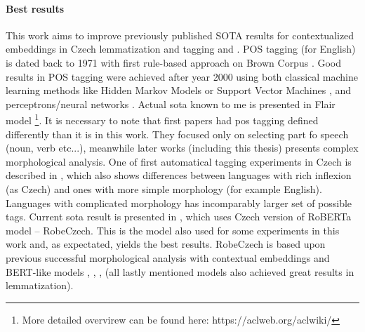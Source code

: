 \paragraph{Best results}
This work aims to improve previously published SOTA results for contextualized embeddings in Czech lemmatization and tagging \citep{straka2019czech} and \citep{Straka2021}. POS tagging (for English) is dated back to 1971 with first rule-based approach on Brown Corpus \citep{greene1971automatic}. Good results in POS tagging were achieved after year 2000 using both classical machine learning methods like Hidden Markov Models \citep{tnt} or Support Vector Machines \citep{svmtool}, and perceptrons/neural networks \citep{collins-2002-discriminative}. Actual \acrlong{sota} known to me is presented in Flair model \citep{Akbik2018}\footnote{More detailed overvirew can be found here: https://aclweb.org/aclwiki/}. It is necessary to note that first papers had \acrshort{pos} tagging defined differently than it is in this work. They focused only on selecting part fo speech (noun, verb etc...), meanwhile later works (including this thesis) presents complex morphological analysis. %
One of first automatical tagging experiments in Czech is described in \citep{Hladka}, which also shows differences between languages with rich inflexion (as Czech) and ones with more simple morphology (for example English). Languages with complicated morphology has incomparably larger set of possible tags. Current \acrshort{sota} result is presented in \citep{Straka2021}, which uses Czech version of RoBERTa model -- RobeCzech. This is the model also used for some experiments in this work and, as expectated,  yields the best results. RobeCzech is based upon previous successful morphological analysis with contextual embeddings and BERT-like models \citep{Straka2019b}, \citep{Straka2019a}, \citep{Straka2019}, \citep{Straka2018} (all lastly mentioned models also achieved great results in lemmatization). %

